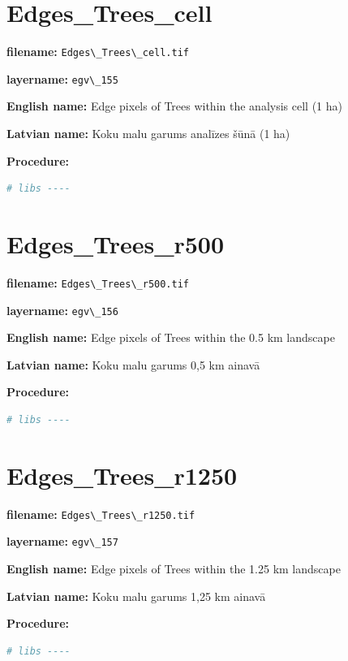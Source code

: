 \documentclass[
]{book}
\newcommand{\passthrough}[1]{#1}
\begin{document}
\section{Edges\_Trees\_cell}\label{ch06.155}

\textbf{filename:} \passthrough{\lstinline!Edges\_Trees\_cell.tif!}

\textbf{layername:} \passthrough{\lstinline!egv\_155!}

\textbf{English name:} Edge pixels of Trees within the analysis cell (1 ha)

\textbf{Latvian name:} Koku malu garums analīzes šūnā (1 ha)

\textbf{Procedure:}

\begin{lstlisting}[language=R]
# libs ----
\end{lstlisting}

\section{Edges\_Trees\_r500}\label{ch06.156}

\textbf{filename:} \passthrough{\lstinline!Edges\_Trees\_r500.tif!}

\textbf{layername:} \passthrough{\lstinline!egv\_156!}

\textbf{English name:} Edge pixels of Trees within the 0.5 km landscape

\textbf{Latvian name:} Koku malu garums 0,5 km ainavā

\textbf{Procedure:}

\begin{lstlisting}[language=R]
# libs ----
\end{lstlisting}

\section{Edges\_Trees\_r1250}\label{ch06.157}

\textbf{filename:} \passthrough{\lstinline!Edges\_Trees\_r1250.tif!}

\textbf{layername:} \passthrough{\lstinline!egv\_157!}

\textbf{English name:} Edge pixels of Trees within the 1.25 km landscape

\textbf{Latvian name:} Koku malu garums 1,25 km ainavā

\textbf{Procedure:}

\begin{lstlisting}[language=R]
# libs ----
\end{lstlisting}
\end{document}
